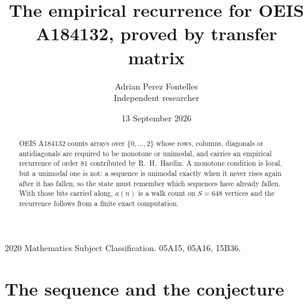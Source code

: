 \documentclass[11pt,a4paper]{article}
\title{The empirical recurrence for OEIS A184132, proved by transfer matrix}
\author{Adrian Perez Fontelles\\ \small Independent researcher}
\date{13 September 2026}
\theoremstyle{plain}
\theoremstyle{definition}
\begin{document}
\maketitle

\begin{abstract}
OEIS A184132 counts arrays over $\{0,\dots,2\}$ whose rows, columns, diagonals or
antidiagonals are required to be monotone or unimodal, and carries an empirical recurrence of
order $81$ contributed by R.~H.~Hardin. A monotone condition is local, but a unimodal one
is not: a sequence is unimodal exactly when it never rises again after it has fallen, so the
state must remember which sequences have already fallen. With those bits carried along, $a(n)$
is a walk count on $S=648$ vertices and the recurrence follows from a finite exact
computation.
\end{abstract}

\noindent\small 2020 Mathematics Subject Classification. 05A15, 05A16, 15B36.\normalsize

\section{The sequence and the conjecture}
\end{document}
